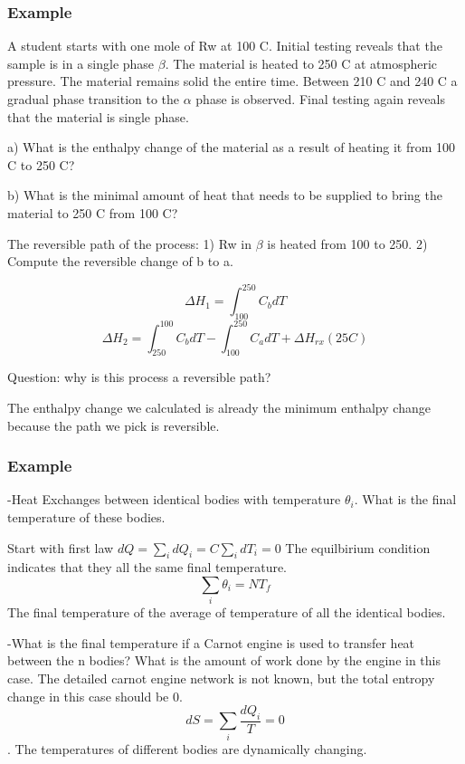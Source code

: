 \documentclass[12pt, oneside]{article}   	%
\begin{document}
\subsubsection{Example}
\par 
A student starts with one mole of Rw at 100 C. Initial testing reveals that the sample is in a single phase $\beta$. The material is heated to 250 C at atmospheric pressure. The material remains solid the entire time. Between 210 C and 240 C a gradual phase transition to the $\alpha$ phase is observed. Final testing again reveals that the material is single phase.
\par 
a) What is the enthalpy change of the material as a result of heating it from 100 C to 250 C? 
\par 
b) What is the minimal amount of heat that needs to be supplied to bring the material to
250 C from 100 C?
\par 
The reversible path of the process: 1) Rw in $\beta$ is heated from 100 to 250. 2) Compute the reversible change of b to a. 


$$\Delta H_1 = \int_{100}^{250} C_b dT$$
$$\Delta H_2 = \int_{250}^{100} C_b dT  - \int_{100}^{250} C_a dT + \Delta H_{rx}(25 C) $$

\par 
Question: why is this process a reversible path? 

The enthalpy change we calculated is already the minimum enthalpy change because the path we pick is  reversible.


\subsubsection{Example}
-Heat Exchanges between identical bodies with temperature ${\theta_i}$. What is the final temperature of these bodies. 
\par 
Start with first law $dQ = \sum_i dQ_i = C\sum_i dT_i  = 0$ The equilbirium condition indicates that they all the same final temperature. 
$$\sum_i \theta_i = N T_f$$ 
The final temperature of the average of temperature of all the identical bodies. 
\par
-What is the final temperature if a Carnot engine is used to transfer heat between the n bodies? What is the amount of work done by the engine in this case. 
The detailed carnot engine network is not known, but the total entropy change in this case should be 0. 
$$dS = \sum_i \frac{dQ_i}{T} = 0$$. The temperatures of different bodies are dynamically changing.  
\end{document}
